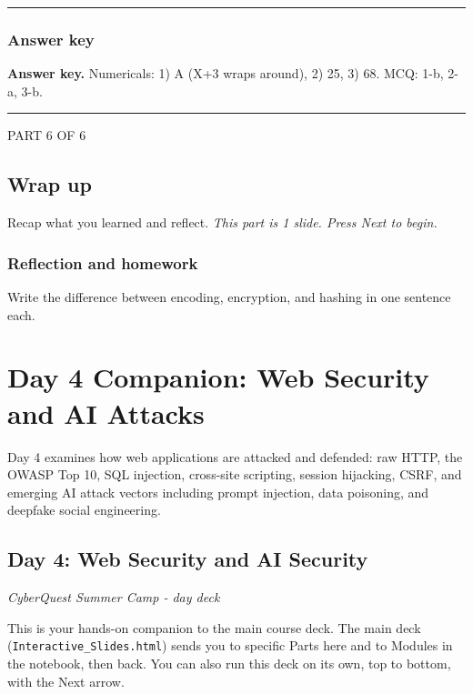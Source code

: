 \documentclass[12pt,openany]{book}
\begin{document}
\medskip\noindent\rule{\linewidth}{0.4pt}\medskip

\medskip

\subsection*{Answer key}


\textbf{Answer key.} Numericals: 1) A (X+3 wraps around), 2) 25, 3) 68. MCQ: 1-b, 2-a, 3-b.


\medskip\noindent\rule{\linewidth}{0.4pt}\medskip

\medskip

\vspace{4pt}\noindent\textsc{PART 6 OF 6}


\section*{Wrap up}

Recap what you learned and reflect.
{\small\itshape\color{gray}This part is 1 slide. Press Next to begin.}

\medskip

\subsection*{Reflection and homework}


Write the difference between encoding, encryption, and hashing in one sentence each.

\medskip

\chapter{Day 4 Companion: Web Security and AI Attacks}
Day 4 examines how web applications are attacked and defended: raw HTTP, the OWASP Top 10, SQL injection, cross-site scripting, session hijacking, CSRF, and emerging AI attack vectors including prompt injection, data poisoning, and deepfake social engineering.

\section*{Day 4: Web Security and AI Security}
{\small\itshape\color{gray}CyberQuest Summer Camp - day deck}


This is your hands-on companion to the main course deck. The main deck (\texttt{Interactive\_Slides.html}) sends you to specific Parts here and to Modules in the notebook, then back. You can also run this deck on its own, top to bottom, with the Next arrow.
\end{document}
